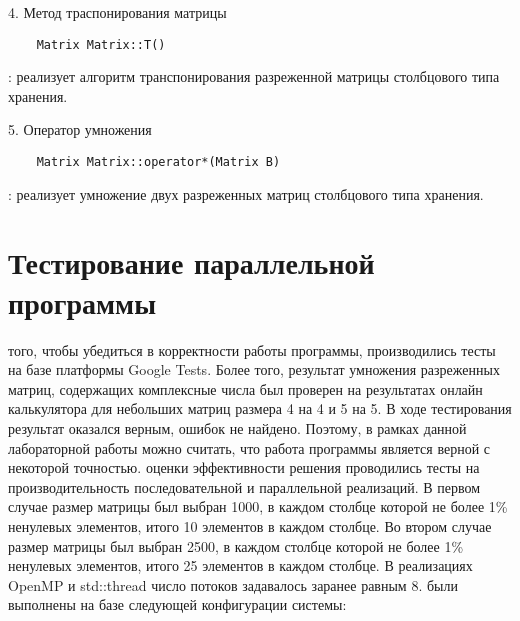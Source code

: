 \documentclass[12pt]{report}
\begin{document}
\par 4. Метод траспонирования матрицы
\begin{lstlisting}
    Matrix Matrix::T()
\end{lstlisting}
: реализует алгоритм транспонирования разреженной матрицы столбцового типа хранения.

\par 5. Оператор умножения
\begin{lstlisting}
    Matrix Matrix::operator*(Matrix B)
\end{lstlisting}
: реализует умножение двух разреженных матриц столбцового типа хранения.

\newpage

\section*{Тестирование параллельной программы}
 того, чтобы убедиться в корректности работы программы, производились тесты на базе платформы Google Tests. Более того, результат умножения разреженных матриц, содержащих комплексные числа был проверен на результатах онлайн калькулятора для небольших матриц размера 4 на 4 и 5 на 5. В ходе тестирования результат оказался верным, ошибок не найдено. Поэтому, в рамках данной лабораторной работы можно считать, что работа программы является верной с некоторой точностью.
 оценки эффективности решения проводились тесты на производительность последовательной и параллельной реализаций. В первом случае размер матрицы был выбран 1000, в каждом столбце которой не более 1\% ненулевых элементов, итого 10 элементов в каждом столбце. Во втором случае размер матрицы был выбран 2500, в каждом столбце которой не более 1\% ненулевых элементов, итого 25 элементов в каждом столбце. В реализациях OpenMP и std::thread число потоков задавалось заранее равным 8.
 были выполнены на базе следующей конфигурации системы:
\end{document}
